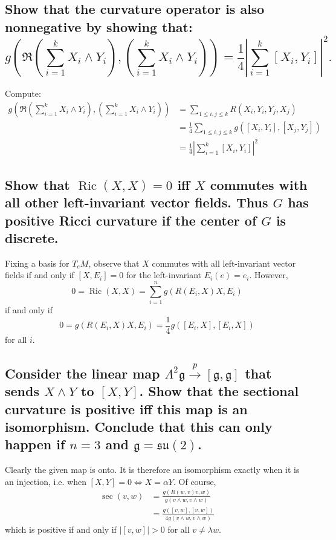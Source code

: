\documentclass[10pt]{article}
\DeclareMathOperator{\ric}{Ric}
\begin{document}
\subsection{Show that the curvature operator is also nonnegative by showing that: $$g \left( \mathfrak{R}\left( \sum_{i=1}^k X_i \wedge Y_i \right) , \left( \sum_{i=1}^k X_i \wedge Y_i \right) \right) = \frac{1}{4} \left| \sum_{i=1}^k [X_i, Y_i ] \right|^2 .$$}

Compute:
\begin{align*}
	g \left( \mathfrak{R}\left( \sum_{i=1}^k X_i \wedge Y_i \right) , \left( \sum_{i=1}^k X_i \wedge Y_i \right) \right) &= \sum_{1 \leq i,j \leq k} R(X_i, Y_i, Y_j, X_j)\\
	&= \frac{1}{4} \sum_{1 \leq i, j \leq k }   g\left( [X_i, Y_i] , [ X_j, Y_j]   \right)\\
	&= \frac{1}{4} \left| \sum_{i=1}^k [X_i, Y_i]  \right|^2
\end{align*}

\subsection{Show that $\ric(X,X) =0$ iff $X$ commutes with all other left-invariant vector fields. Thus $G$ has positive Ricci curvature if the center of $G$ is discrete.}
Fixing a basis for $T_e M$, observe that $X$ commutes with all left-invariant vector fields if and only if $[X,E_i] = 0$ for the left-invariant $E_i(e) = e_i$. However,
\[0 = \ric (X,X) = \sum_{i=1}^n g( R (E_i, X) X, E_i)\] 
if and only if 
\[ 0 = g(R(E_i, X) X , E_i) =  \frac{1}{4} g([E_i, X ] , [E_i, X] ) \]
for all $i$.

\subsection{Consider the linear map $\Lambda^2 \mathfrak{g} \stackrel{p}{\to} [\mathfrak{g} , \mathfrak{g}]$ that sends $X \wedge Y$ to $[X,Y]$. Show that the sectional curvature is positive iff this map is an isomorphism. Conclude that this can only happen if $n=3$ and $\mathfrak{g} = \mathfrak{su} (2)$.}

Clearly the given map is onto. It is therefore an isomorphism exactly when it is an injection, i.e. when $[X,Y] = 0 \iff X = \alpha Y$. Of course, 
\begin{align*}
	\sec(v,w) &= \frac{g(R(w,v)v,w)}{g(v \wedge w, v \wedge w)}\\
	&= \frac{g([v,w],[v,w])}{ 4 g(v \wedge w, v \wedge w)}
\end{align*}
which is positive if and only if $|[v,w]| > 0$ for all $v \neq \lambda w$.
\end{document}
